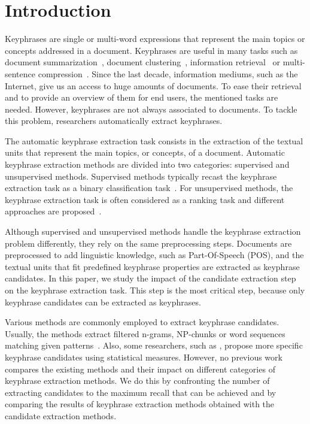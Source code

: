 \section{Introduction}
\label{sec:section}
  Keyphrases are single or multi-word expressions that represent the main topics
  or concepts addressed in a document. Keyphrases are useful in many tasks such
  as document summarization~\cite{avanzo2005keyphrase}, document
  clustering~\cite{han2007webdocumentclustering}, information
  retrieval~\cite{medelyan2008smalltrainingset} or multi-sentence
  compression~\cite{boudin2013multisentencecompression}.
  Since the last decade, information mediums, such as the Internet, give us an
  access to huge amounts of documents. To ease their retrieval and to provide an
  overview of them for end users, the mentioned tasks are needed. However,
  keyphrases are not always associated to documents. To tackle this problem,
  researchers automatically extract keyphrases.

  The automatic keyphrase extraction task consists in the extraction of the
  textual units that represent the main topics, or concepts, of a document.
  Automatic keyphrase extraction methods are divided into two
  categories: supervised and unsupervised methods. Supervised methods typically
  recast the keyphrase extraction task as a binary classification
  task~\cite{witten1999kea}. For unsupervised methods, the keyphrase extraction
  task is often considered as a ranking task and different approaches are
  proposed~\cite{hassan2010conundrums}.

  Although supervised and unsupervised methods handle the keyphrase extraction
  problem differently, they rely on the same preprocessing steps. Documents are
  preprocessed to add linguistic knowledge, such as Part-Of-Speech (POS), and
  the textual units that fit predefined keyphrase properties are extracted as
  keyphrase candidates. In this paper, we study the impact of the candidate
  extraction step on the keyphrase extraction task. This step is the most
  critical step, because only keyphrase candidates can be extracted as
  keyphrases.

  Various methods are commonly employed to extract keyphrase candidates.
  Usually, the methods extract filtered n-grams, NP-chunks or word sequences
  matching given patterns~\cite{hulth2003keywordextraction}. Also, some
  researchers, such as ,
  propose more specific keyphrase candidates using statistical measures.
  However, no previous work compares the existing methods and their impact on
  different categories of keyphrase extraction methods. We do this by
  confronting the number of extracting candidates to the maximum recall that
  can be achieved and by comparing the results of keyphrase extraction methods
  obtained with the candidate extraction methods.

